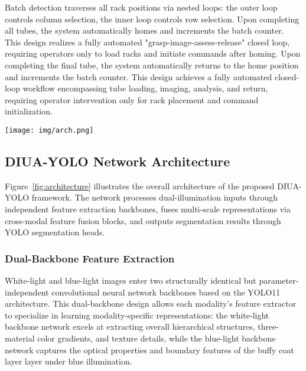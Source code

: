 Batch detection traverses all rack positions via nested loops: the outer loop controls column selection, the inner loop controls row selection. Upon completing all tubes, the system automatically homes and increments the batch counter. This design realizes a fully automated "grasp-image-assess-release" closed loop, requiring operators only to load racks and initiate commands after homing. Upon completing the final tube, the system automatically returns to the home position and increments the batch counter. This design achieves a fully automated closed-loop workflow encompassing tube loading, imaging, analysis, and return, requiring operator intervention only for rack placement and command initialization.

\begin{figure*}[!t]
\centering
\texttt{[image: img/arch.png]}
\caption{\textbf{The proposed DIUA-YOLO framework,} comprising dual-illumination input, dual-backbone feature extraction, cross-spectral feature fusion, and YOLO11 segmentation modules. 
White-light and blue-light images are independently processed through modality-specific backbones to capture complementary structural and contrast information. 
Fused multi-scale representations are decoded through neck and segmentation heads to accurately localize plasma, buffy coat, and erythrocyte layers.}
\label{fig:architecture}
\end{figure*}

\subsection{DIUA-YOLO Network Architecture}

Figure~\ref{fig:architecture} illustrates the overall architecture of the proposed DIUA-YOLO framework. The network processes dual-illumination inputs through independent feature extraction backbones, fuses multi-scale representations via cross-modal feature fusion blocks, and outputs segmentation results through YOLO segmentation heads.

\subsubsection{Dual-Backbone Feature Extraction} White-light and blue-light images enter two structurally identical but parameter-independent convolutional neural network backbones based on the YOLO11 architecture. This dual-backbone design allows each modality's feature extractor to specialize in learning modality-specific representations: the white-light backbone network excels at extracting overall hierarchical structures, three-material color gradients, and texture details, while the blue-light backbone network captures the optical properties and boundary features of the buffy coat layer layer under blue illumination.

